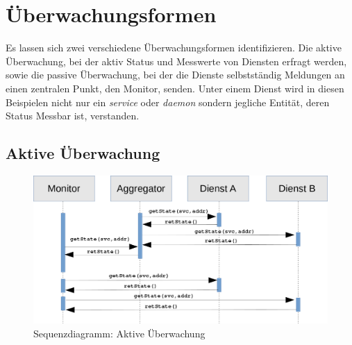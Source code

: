 \section{Überwachungsformen}

Es lassen sich zwei verschiedene Überwachungsformen identifizieren. Die aktive 
Überwachung, bei der aktiv Status und Messwerte von Diensten erfragt werden, sowie die 
passive Überwachung, bei der die Dienste selbstständig Meldungen an einen zentralen 
Punkt, den Monitor, senden. Unter einem Dienst wird in diesen Beispielen nicht nur ein 
\textit{service} oder \textit{daemon} sondern jegliche Entität, deren Status Messbar ist, 
verstanden.

\subsection{Aktive Überwachung}
\begin{figure}[htbp]
    \caption{Sequenzdiagramm: Aktive Überwachung}
    \label{aktiv}\vspace{0.2cm}
    \centering
    \includegraphics[scale=0.36]{img/sequence_uml_active_trans}

\end{figure}

